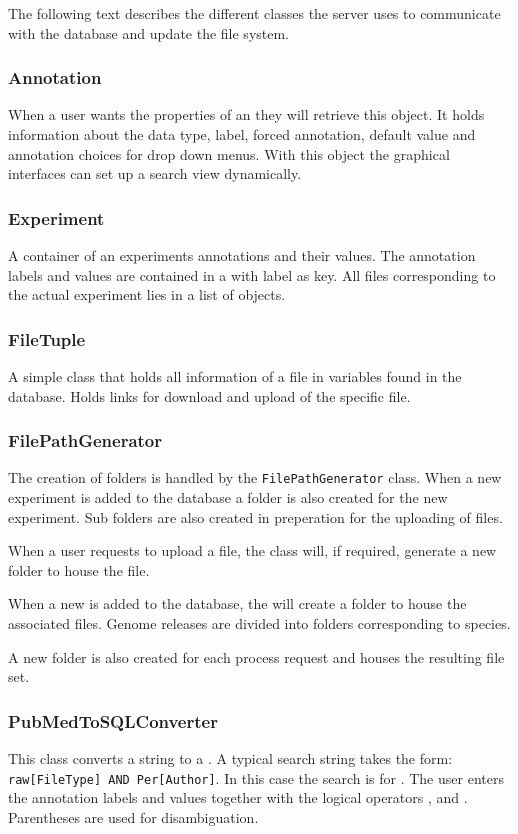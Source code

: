 The following text describes the different classes the server uses to communicate with the database and update the file system.

\subsubsection{Annotation}
When a user wants the properties of an  they will retrieve this object. It holds information about the data type, label, forced annotation, default value and annotation choices for drop down menus. With this object the graphical interfaces can set up a search view dynamically.

\subsubsection{Experiment}
A container of an experiments annotations and their values. The annotation labels and values are contained in a  with label as key. All files corresponding to the actual experiment lies in a list of  objects.

\subsubsection{FileTuple}
A simple class that holds all information of a file in variables found in the database. Holds links for download and upload of the specific file.

\subsubsection{FilePathGenerator}
The creation of folders is handled by the \texttt{FilePathGenerator} class. When a new experiment is added to the database a folder is also created for the new experiment. Sub folders are also created in preperation for the uploading of files.

When a user requests to upload a file, the  class will, if required, generate a new folder to house the file. 

When a new  is added to the database, the  will create a folder to house the associated files. Genome releases are divided into folders corresponding to species.

A new folder is also created for each process request and houses the resulting file set.

\subsubsection{PubMedToSQLConverter}
This class converts a  string to a . A typical  search string takes the form: \texttt{raw[FileType] AND Per[Author]}. In this case the search is for . The user enters the annotation labels and values together with the logical operators ,  and . Parentheses are used for disambiguation. 

